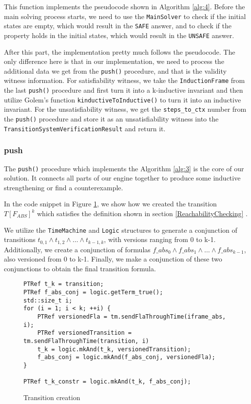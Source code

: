 This function implements the pseudocode shown in Algorithm \ref{alg:4}. Before the main solving process starts, we need to use the \texttt{MainSolver} to check if the initial states are empty, which would result in the \texttt{SAFE} answer, and to check if the property holds in the initial states, which would result in the \texttt{UNSAFE} answer.

After this part, the implementation pretty much follows the pseudocode. The only difference here is that in our implementation, we need to process the additional data we get from the \texttt{push()} procedure, and that is the validity witness information. For satisfiability witness, we take the \texttt{InductionFrame} from the last \texttt{push()} procedure and first turn it into a k-inductive invariant and then utilize Golem's function \texttt{kinductiveToInductive()} to turn it into an inductive invariant. For the unsatisfiability witness, we get the \texttt{steps\_to\_ctx} number from the \texttt{push()} procedure and store it as an unsatisfiability witness into the \texttt{TransitionSystemVerificationResult} and return it.

\subsubsection{push}

\noindent The \texttt{push()} procedure which implements the Algorithm \ref{alg:3} is the core of our solution. It connects all parts of our engine together to produce some inductive strengthening or find a counterexample.  


In the code snippet in Figure \ref{code:TransitionGen}, we show how we created the transition $T[F_{ABS}]^k$ which satisfies the definition shown in section \ref{ReachabilityChecking} .

We utilize the \texttt{TimeMachine} and \texttt{Logic} structures to generate a conjunction of transitions $t_{0,1} \wedge t_{1,2} \wedge \dots \wedge t_{k-1, k}$, with versions ranging from 0 to k-1. Additionally, we create a conjunction of formulas $f\_abs_0 \wedge f\_abs_1 \wedge \dots \wedge f\_abs_{k-1}$, also versioned from 0 to k-1. Finally, we make a conjunction of these two conjunctions to obtain the final transition formula.

\begin{figure}[H]
\begin{lstlisting}
PTRef t_k = transition;
PTRef f_abs_conj = logic.getTerm_true();
std::size_t i;
for (i = 1; i < k; ++i) {
    PTRef versionedFla = tm.sendFlaThroughTime(iframe_abs, i);
    PTRef versionedTransition = tm.sendFlaThroughTime(transition, i)
    t_k = logic.mkAnd(t_k, versionedTransition);
    f_abs_conj = logic.mkAnd(f_abs_conj, versionedFla);
}

PTRef t_k_constr = logic.mkAnd(t_k, f_abs_conj);
\end{lstlisting}
\caption{Transition creation}\label{code:TransitionGen}
\end{figure}


